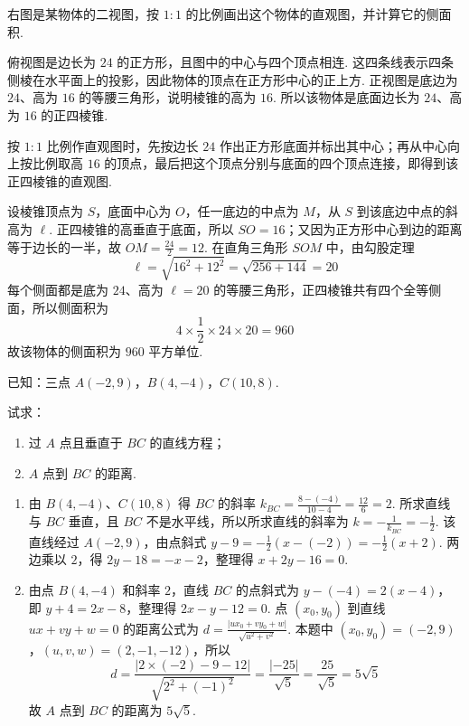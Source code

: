 \begin{problem}
右图是某物体的二视图，按 \(1:1\) 的比例画出这个物体的直观图，并计算它的侧面积.
\end{problem}

\begin{solution}
俯视图是边长为 \(24\) 的正方形，且图中的中心与四个顶点相连. 这四条线表示四条侧棱在水平面上的投影，因此物体的顶点在正方形中心的正上方. 正视图是底边为 \(24\)、高为 \(16\) 的等腰三角形，说明棱锥的高为 \(16\). 所以该物体是底面边长为 \(24\)、高为 \(16\) 的正四棱锥.

按 \(1:1\) 比例作直观图时，先按边长 \(24\) 作出正方形底面并标出其中心；再从中心向上按比例取高 \(16\) 的顶点，最后把这个顶点分别与底面的四个顶点连接，即得到该正四棱锥的直观图.

设棱锥顶点为 \(S\)，底面中心为 \(O\)，任一底边的中点为 \(M\)，从 \(S\) 到该底边中点的斜高为 \(\ell\). 正四棱锥的高垂直于底面，所以 \(SO=16\)；又因为正方形中心到边的距离等于边长的一半，故 \(OM=\frac{24}{2}=12\). 在直角三角形 \(SOM\) 中，由勾股定理
\[
\ell=\sqrt{16^2+12^2}=\sqrt{256+144}=20
\]
每个侧面都是底为 \(24\)、高为 \(\ell=20\) 的等腰三角形，正四棱锥共有四个全等侧面，所以侧面积为
\[
4\times\frac{1}{2}\times 24\times 20=960
\]
故该物体的侧面积为 \(960\text{ 平方单位}\).
\end{solution}

\begin{problem}
已知：三点 \(A\left(-2,9\right)\)，\(B\left(4,-4\right)\)，\(C\left(10,8\right)\).

试求：

\begin{enumerate}
    \item 过 \(A\) 点且垂直于 \(BC\) 的直线方程；
    \item \(A\) 点到 \(BC\) 的距离.
\end{enumerate}
\end{problem}

\begin{solution}
\begin{enumerate}
\item 由 \(B(4,-4)\)、\(C(10,8)\) 得 \(BC\) 的斜率
\(k_{BC}=\frac{8-(-4)}{10-4}=\frac{12}{6}=2\). 所求直线与 \(BC\) 垂直，且 \(BC\) 不是水平线，所以所求直线的斜率为 \(k=-\frac{1}{k_{BC}}=-\frac{1}{2}\). 该直线经过 \(A(-2,9)\)，由点斜式
\(y-9=-\frac{1}{2}\left(x-(-2)\right)=-\frac{1}{2}(x+2)\). 两边乘以 \(2\)，得 \(2y-18=-x-2\)，整理得 \(x+2y-16=0\).

\item 由点 \(B(4,-4)\) 和斜率 \(2\)，直线 \(BC\) 的点斜式为 \(y-(-4)=2(x-4)\)，即 \(y+4=2x-8\)，整理得 \(2x-y-12=0\). 点 \((x_0,y_0)\) 到直线 \(u x+v y+w=0\) 的距离公式为
\(d=\frac{\lvert u x_0+v y_0+w\rvert}{\sqrt{u^2+v^2}}\). 本题中 \((x_0,y_0)=(-2,9)\)，\((u,v,w)=(2,-1,-12)\)，所以
\[
d=\frac{\left|2\times(-2)-9-12\right|}{\sqrt{2^2+(-1)^2}}=\frac{\lvert-25\rvert}{\sqrt{5}}=\frac{25}{\sqrt{5}}=5\sqrt{5}
\]
故 \(A\) 点到 \(BC\) 的距离为 \(5\sqrt{5}\).
\end{enumerate}
\end{solution}

